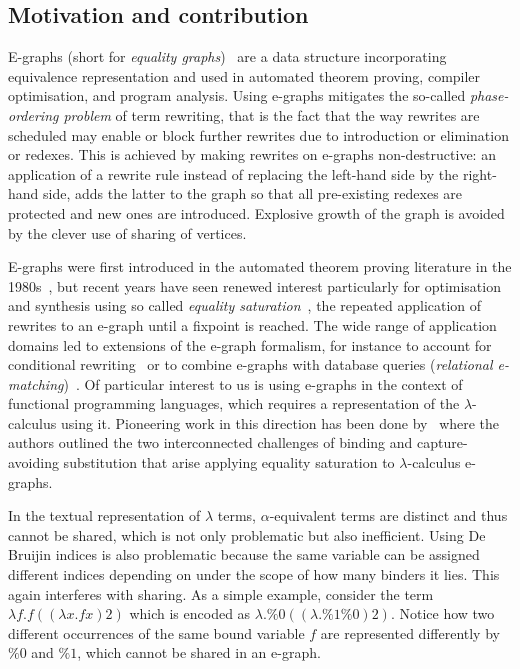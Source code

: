 \documentclass[]{IEEEtran}
\begin{document}
\subsection{Motivation and contribution}

E-graphs (short for \emph{equality graphs})~\cite{EggPaper} are a data structure incorporating equivalence representation and used in automated theorem proving, compiler optimisation, and program analysis. 
Using e-graphs mitigates the so-called \emph{phase-ordering problem} of term rewriting, that is the fact that the way rewrites are scheduled may enable or block further rewrites due to introduction or elimination or redexes. 
This is achieved by making rewrites on e-graphs non-destructive: an application of a rewrite rule instead of replacing the left-hand side by the right-hand side, adds the latter to the graph so that all pre-existing redexes are protected and new ones are introduced. 
Explosive growth of the graph is avoided by the clever use of sharing of vertices. 

E-graphs were first introduced in the automated theorem proving literature in the 1980s~\cite{nelson1980techniques}, but recent years have seen renewed interest particularly for optimisation and synthesis using so called \emph{equality saturation}~\cite{10.1145/1594834.1480915, griggio_proceedings_2022, EggPaper,flatt_small_2022}, the repeated application of rewrites to an e-graph until a fixpoint is reached. 
The wide range of application domains led to extensions of the e-graph formalism, for instance to account for conditional rewriting~\cite{singher2023colored} or  to combine e-graphs with database queries (\emph{relational e-matching})~\cite{zhang_relational_2022}.
Of particular interest to us is using e-graphs in the context of functional programming languages, which requires a representation of the $\lambda$-calculus using it. 
Pioneering work in this direction has been done by~\cite{koehler2022sketchguided} where
the authors outlined the two interconnected challenges of binding and capture-avoiding substitution that arise applying equality saturation to $\lambda$-calculus e-graphs.

In the textual representation of $\lambda$ terms, $\alpha$-equivalent terms are distinct and thus cannot be shared, which is not only problematic but also inefficient. 
Using De Bruijin indices is also problematic because the same variable can be assigned different indices depending on under the scope of how many binders it lies. 
This again interferes with sharing. 
As a simple example, consider the term $\lambda f . f ((\lambda x . f x) 2)$ which is encoded as $\lambda . \%0 ((\lambda . \%1 \%0) 2)$.
Notice how two different occurrences of the same bound variable $f$ are represented differently by $\%0$ and $\%1$, which cannot be shared in an e-graph.
\end{document}

